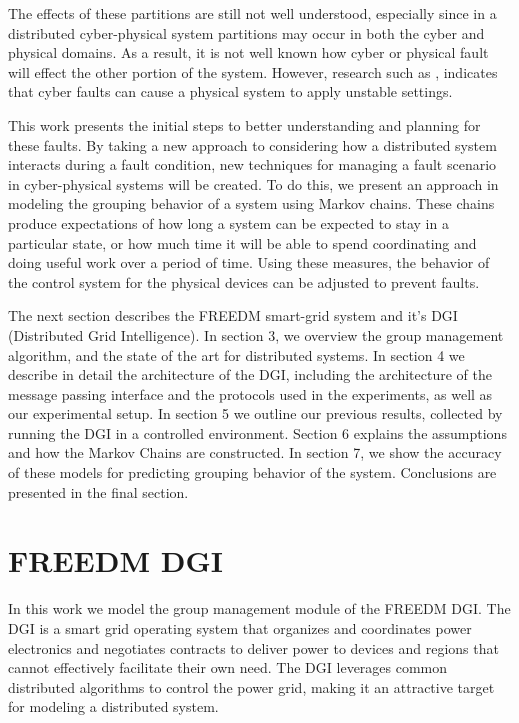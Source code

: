 The effects of these partitions are still not well understood, especially since in a distributed
cyber-physical system partitions may occur in both the cyber and physical domains. As a result,
it is not well known how cyber or physical fault will effect the other portion of the system.
However, research such as \cite{HARINI}\cite{TSG}, indicates that cyber faults can cause a
physical system to apply unstable settings.

This work presents the initial steps to better understanding and planning for these faults.
By taking a new approach to considering how a distributed system interacts during a fault condition,
new techniques for managing a fault scenario in cyber-physical systems will be created. To do
this, we present an approach in modeling the grouping behavior of a system using Markov chains.
These chains produce expectations of how long a system can be expected to stay in a particular
state, or how much time it will be able to spend coordinating and doing useful work over a period
of time. Using these measures, the behavior of the control system for the physical devices 
can be adjusted to prevent faults.

The next section describes the FREEDM smart-grid system and it's DGI (Distributed Grid Intelligence). In section 3,
we overview the group management algorithm, and the state of the art for distributed
systems. In section 4 we describe in detail the architecture of the DGI, including the architecture
of the message passing interface and the protocols used in the experiments, as well as our
experimental setup. In section 5 we outline our previous results, collected by running the DGI
in a controlled environment. Section 6 explains the assumptions and how the Markov Chains are
constructed. In section 7, we show the accuracy of these models for predicting grouping behavior
of the system. Conclusions are presented in the final section.

\section{FREEDM DGI}
In this work we model the group management module of the FREEDM DGI.
The DGI is a smart grid operating system
that organizes and coordinates power electronics and negotiates contracts to
deliver power to devices and regions that cannot effectively facilitate their own need.
The DGI leverages common distributed algorithms to control the power grid, making it an
attractive target for modeling a distributed system.

